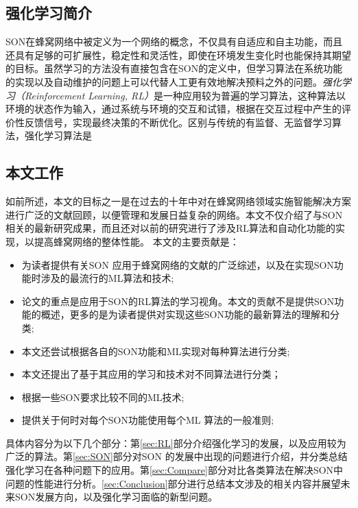 ﻿\documentclass[11pt,draftclsnofoot,onecolumn,journal,letterpaper]{IEEEtran}
\begin{document}
\subsection{强化学习简介}


SON在蜂窝网络中被定义为一个网络的概念，不仅具有自适应和自主功能，而且还具有足够的可扩展性，稳定性和灵活性，即使在环境发生变化时也能保持其期望的目标。虽然学习的方法没有直接包含在SON的定义中，但学习算法在系统功能的实现以及自动维护的问题上可以代替人工更有效地解决预料之外的问题。\emph{强化学习（Reinforcement Learning, RL）}是一种应用较为普遍的学习算法，这种算法以环境的状态作为输入，通过系统与环境的交互和试错，根据在交互过程中产生的评价性反馈信号，实现最终决策的不断优化。区别与传统的有监督、无监督学习算法，强化学习算法是


\subsection{本文工作}

如前所述，本文的目标之一是在过去的十年中对在蜂窝网络领域实施智能解决方案进行广泛的文献回顾，以便管理和发展日益复杂的网络。本文不仅介绍了与SON相关的最新研究成果，而且还对以前的研究进行了涉及RL算法和自动化功能的实现，以提高蜂窝网络的整体性能。
本文的主要贡献是：
\begin{itemize}
  \item 为读者提供有关SON 应用于蜂窝网络的文献的广泛综述，以及在实现SON功能时涉及的最流行的ML算法和技术;
  \item 论文的重点是应用于SON的RL算法的学习视角。本文的贡献不是提供SON功能的概述，更多的是为读者提供对实现这些SON功能的最新算法的理解和分类;
  \item 本文还尝试根据各自的SON功能和ML实现对每种算法进行分类;
  \item 本文还提出了基于其应用的学习和技术对不同算法进行分类；
  \item 根据一些SON要求比较不同的ML技术;
  \item 提供关于何时对每个SON功能使用每个ML 算法的一般准则;
\end{itemize}

具体内容分为以下几个部分：第\ref{sec:RL}部分介绍强化学习的发展，以及应用较为广泛的算法。第\ref{sec:SON}部分对SON 的发展中出现的问题进行介绍，并分类总结强化学习在各种问题下的应用。第\ref{sec:Compare}部分对比各类算法在解决SON中问题的性能进行分析。\ref{sec:Conclusion}部分进行总结本文涉及的相关内容并展望未来SON发展方向，以及强化学习面临的新型问题。
\end{document}
